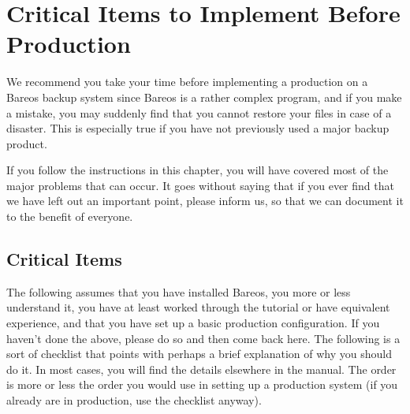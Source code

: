 
\chapter{Critical Items to Implement Before Production}
\label{CriticalChapter}

We recommend you take your time before implementing a production on a Bareos
backup system since Bareos is a rather complex program, and if you make a
mistake, you may suddenly find that you cannot restore your files in case
of a disaster.  This is especially true if you have not previously used a
major backup product.

If you follow the instructions in this chapter, you will have covered most of
the major problems that can occur. It goes without saying that if you ever
find that we have left out an important point, please inform us, so
that we can document it to the benefit of everyone.

\label{Critical}
\section{Critical Items}

The following assumes that you have installed Bareos, you more or less
understand it, you have at least worked through the tutorial or have
equivalent experience, and that you have set up a basic production
configuration. If you haven't done the above, please do so and then come back
here. The following is a sort of checklist that points with perhaps a brief
explanation of why you should do it.  In most cases, you will find the
details elsewhere in the manual.  The order is more or less the order you
would use in setting up a production system (if you already are in
production, use the checklist anyway).

